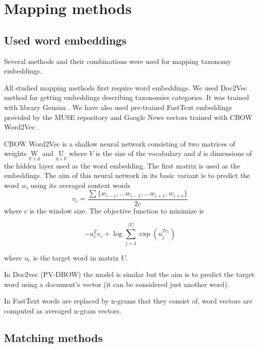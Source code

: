 \documentclass[11pt,a4paper]{article}
\begin{document}
\section{Mapping methods}

\subsection{Used word embeddings}

Several methods and their combinations were used for mapping taxonomy embeddings.

All studied mapping methods first require word embeddings. We used Doc2Vec \cite{doc2vec} method for getting embeddings describing taxonomies categories. It was trained with library Gensim \cite{gensim}. We have also used pre-trained FastText \cite{fasttext} embeddings provided by the MUSE repository and Google News vectors trained with CBOW Word2Vec \cite{mikolov2013}. 

CBOW Word2Vec is a shallow neural network consisting of two matrices of weights $\underset{V\times d}{\mathrm{W}}$ and $\underset{d\times V}{\mathrm{U}}$ where $V$ is the size of the vocabulary and $d$ is dimensions of the hidden layer used as the word embedding.
The first matrix is used as the embeddings.
The aim of this neural network in its basic variant is to predict the word $w_i$ using its averaged context words
$$v_c = \dfrac{\sum\{w_{i-c},...w_{i-1},...w_{i+1}, w_{i+c}\}}{2c}$$
where $c$ is the window size. The objective function to minimize is

$$ -u_c^Tv_c + \log \sum_{j=1}^{|V|}\exp(u_j^{Tv_c})$$

where $u_c$ is the target word in matrix $U$.

In Doc2vec (PV-DBOW) the model is similar but the aim is to predict the target word using a document's vector (it can be considered just another word).

In FastText words are replaced by n-grams that they consist of, word vectors are computed as averaged n-gram vectors.

\subsection{Matching methods}
\end{document}
